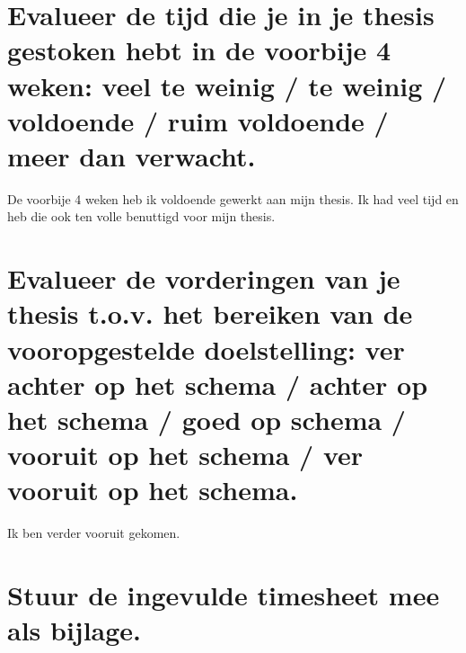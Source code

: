 \documentclass[a4paper, 11pt]{article}
\begin{document}
\section{Evalueer de tijd die je in je thesis gestoken hebt in de voorbije 4 weken: veel te weinig / te weinig / voldoende / ruim voldoende / meer dan verwacht.}
De voorbije 4 weken heb ik voldoende gewerkt aan mijn thesis. Ik had veel tijd en heb die ook ten volle benuttigd voor mijn thesis. 
\section{Evalueer de vorderingen van je thesis t.o.v. het bereiken van de vooropgestelde doelstelling: ver achter op het schema / achter op het schema / goed op schema / vooruit op het schema / ver vooruit op het schema.}
Ik ben verder vooruit gekomen. 
\section{Stuur de ingevulde timesheet mee als bijlage.}









 
\end{document}
